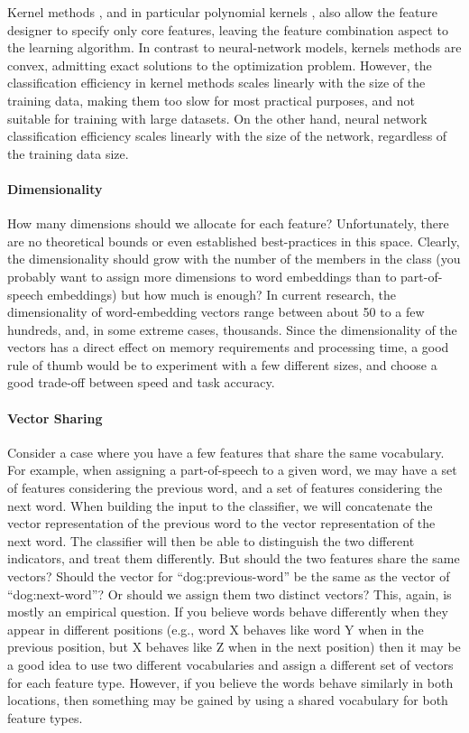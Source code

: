 \documentclass[jair,twoside,11pt,theapa]{article}
\begin{document}
{Kernel methods \cite{shawe-taylor2004kernel}, and in particular polynomial
kernels \cite{kudo2003fast}, also allow the
feature designer to specify only core features, leaving the feature combination
aspect to the learning algorithm.  In contrast to neural-network models, kernels
methods are convex, admitting exact solutions to the optimization problem.
However, the classification efficiency in kernel methods scales linearly with the size
of the training data, making them too slow for most practical purposes, and not
suitable for training with large datasets.
On the other hand, neural network
classification efficiency scales linearly with the size of the network,
regardless of the training data size.

\paragraph{Dimensionality} How many dimensions should we allocate for each
feature? Unfortunately, there are no theoretical bounds or even established best-practices
in this space.
Clearly, the dimensionality should grow with the number of the members in the class
(you probably want to assign more dimensions to word embeddings than to
part-of-speech embeddings) but how much is enough? In current research, the
dimensionality of word-embedding vectors range between about 50 to a few hundreds,
and, in some extreme cases, thousands. Since the dimensionality of the vectors
has a direct effect on memory requirements and processing time, a good rule of
thumb would be to experiment with a few different sizes, and choose a good
trade-off between speed and task accuracy.

\paragraph{Vector Sharing} Consider a case where you have a few features that
share the same vocabulary. For example, when assigning a part-of-speech to a
given word, we may have a set of features considering the
previous word, and a set of features considering the next word. When building
the input to the classifier, we will concatenate the vector representation of
the previous word to the vector representation of the next word. The classifier
will then be able to distinguish the two different indicators, and treat them
differently. But should the two features share the same vectors? Should the
vector for ``dog:previous-word'' be the same as the vector of ``dog:next-word''?
Or should we assign them two distinct vectors?
This, again, is mostly an empirical question. If you believe words behave
differently when they appear in different positions (e.g., word X behaves like
word Y when in the previous position, but X behaves like Z when in the next
position) then it may be a good idea to use two different vocabularies and
assign a different set of vectors for each feature type. However, if you believe
the words behave similarly in both locations, then something may be gained by
using a shared vocabulary for both feature types.

}
\end{document}
